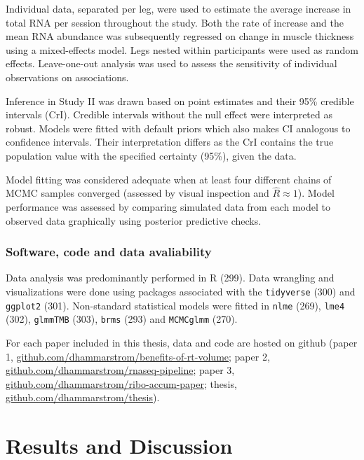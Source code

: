 \documentclass[twoside,10pt]{gihclass} %
\begin{document}
Individual data, separated per leg, were used to estimate the average increase in total RNA per session throughout the study. Both the rate of increase and the mean RNA abundance was subsequently regressed on change in muscle thickness using a mixed-effects model. Legs nested within participants were used as random effects. Leave-one-out analysis was used to assess the sensitivity of individual observations on associations.

Inference in Study II was drawn based on point estimates and their 95\% credible intervals (CrI). Credible intervals without the null effect were interpreted as robust. Models were fitted with default priors which also makes CI analogous to confidence intervals. Their interpretation differs as the CrI contains the true population value with the specified certainty (95\%), given the data.

Model fitting was considered adequate when at least four different chains of MCMC samples converged (assessed by visual inspection and \(\hat{R}\approx 1\)). Model performance was assessed by comparing simulated data from each model to observed data graphically using posterior predictive checks.

\hypertarget{software-code-and-data-avaliability}{%
\subsection{Software, code and data avaliability}\label{software-code-and-data-avaliability}}

Data analysis was predominantly performed in R (299).
Data wrangling and visualizations were done using packages associated with the
\texttt{tidyverse} (300) and \texttt{ggplot2} (301).
Non-standard statistical models were fitted in
\texttt{nlme} (269),
\texttt{lme4} (302),
\texttt{glmmTMB} (303),
\texttt{brms} (293) and
\texttt{MCMCglmm} (270).

For each paper included in this thesis, data and code are hosted on github (paper 1, \href{https://github.com/dhammarstrom/benefits-of-rt-volume}{github.com/dhammarstrom/benefits-of-rt-volume}; paper 2, \href{https://github.com/dhammarstrom/rnaseq-pipeline}{github.com/dhammarstrom/rnaseq-pipeline};
paper 3, \href{https://github.com/dhammarstrom/ribo-accum-paper}{github.com/dhammarstrom/ribo-accum-paper};
thesis, \href{https://github.com/dhammarstrom/thesis}{github.com/dhammarstrom/thesis}).

\hypertarget{results-and-discussion}{%
\chapter{Results and Discussion}\label{results-and-discussion}}
\end{document}
